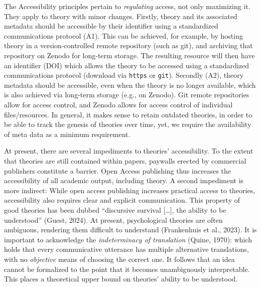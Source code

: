 \documentclass[
  man,floatsintext]{apa6}
\begin{document}
The Accessibility principles pertain to \emph{regulating} access, not only maximizing it.
They apply to theory with minor changes.
Firstly, theory and its associated metadata should be accessible by their identifier using a standardized communications protocol (A1).
This can be achieved, for example, by hosting theory in a version-controlled remote repository (such as git), and archiving that repository on Zenodo for long-term storage.
The resulting resource will then have an identifier (DOI) which allows the theory to be accessed using a standardized communications protocol (download via \texttt{https} or \texttt{git}).
Secondly (A2), theory metadata should be accessible, even when the theory is no longer available,
which is also achieved via long-term storage (e.g., on Zenodo).
Git remote repositories allow for access control,
and Zenodo allows for access control of individual files/resources.
In general, it makes sense to retain outdated theories, in order to be able to track the genesis of theories over time, yet, we require the availability of meta data as a minimum requirement.

At present, there are several impediments to theories' accessibility.
To the extent that theories are still contained within papers,
paywalls erected by commercial publishers constitute a barrier.
Open Access publishing thus increases the accessibility of all academic output, including theory.
A second impediment is more indirect:
While open access publishing increases practical access to theories,
accessibility also requires clear and explicit communication.
This property of good theories has been dubbed ``discursive survival {[}\ldots{]}, the ability to be understood'' (Guest, 2024).
At present, psychological theories are often ambiguous, rendering them difficult to understand (Frankenhuis et al., 2023).
It is important to acknowledge the \emph{indeterminacy of translation} (Quine, 1970):
which holds that every communicative utterance has multiple alternative translations, with no \emph{objective} means of choosing the correct one.
It follows that an idea cannot be formalized to the point that it becomes unambiguously interpretable.
This places a theoretical upper bound on theories' ability to be understood.
\end{document}
